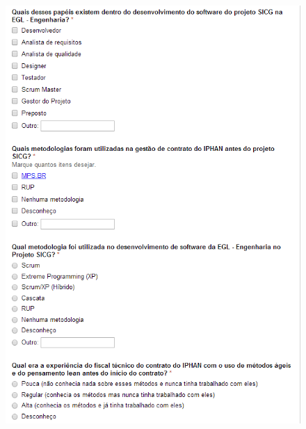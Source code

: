 \begin{apendicesenv}
\begin{figure}[H]
		\centering
			\includegraphics[scale=1.0]{figuras/quest3.png}

		\label{quest3}
\end{figure}


\end{apendicesenv}
